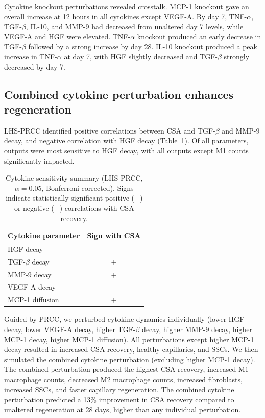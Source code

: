 \documentclass[11pt]{article}
\begin{document}
Cytokine knockout perturbations revealed crosstalk. MCP-1 knockout gave an overall increase at 12 hours in all cytokines except VEGF-A. By day 7, TNF-$\alpha$, TGF-$\beta$, IL-10, and MMP-9 had decreased from unaltered day 7 levels, while VEGF-A and HGF were elevated. TNF-$\alpha$ knockout produced an early decrease in TGF-$\beta$ followed by a strong increase by day 28. IL-10 knockout produced a peak increase in TNF-$\alpha$ at day 7, with HGF slightly decreased and TGF-$\beta$ strongly decreased by day 7.

\subsection{Combined cytokine perturbation enhances regeneration}
LHS-PRCC identified positive correlations between CSA and TGF-$\beta$ and MMP-9 decay, and negative correlation with HGF decay (Table~\ref{tab:sens}). Of all parameters, outputs were most sensitive to HGF decay, with all outputs except M1 counts significantly impacted.

\begin{table}[h]
\centering
\caption{Cytokine sensitivity summary (LHS-PRCC, $\alpha=0.05$, Bonferroni corrected). Signs indicate statistically significant positive (+) or negative ($-$) correlations with CSA recovery.}
\label{tab:sens}
\begin{tabular}{lc}
\toprule
Cytokine parameter & Sign with CSA \\
\midrule
HGF decay         & $-$ \\
TGF-$\beta$ decay & $+$ \\
MMP-9 decay       & $+$ \\
VEGF-A decay      & $-$ \\
MCP-1 diffusion   & $+$ \\
\bottomrule
\end{tabular}
\end{table}

Guided by PRCC, we perturbed cytokine dynamics individually (lower HGF decay, lower VEGF-A decay, higher TGF-$\beta$ decay, higher MMP-9 decay, higher MCP-1 decay, higher MCP-1 diffusion). All perturbations except higher MCP-1 decay resulted in increased CSA recovery, healthy capillaries, and SSCs. We then simulated the combined cytokine perturbation (excluding higher MCP-1 decay). The combined perturbation produced the highest CSA recovery, increased M1 macrophage counts, decreased M2 macrophage counts, increased fibroblasts, increased SSCs, and faster capillary regeneration. The combined cytokine perturbation predicted a 13\% improvement in CSA recovery compared to unaltered regeneration at 28 days, higher than any individual perturbation.
\end{document}
